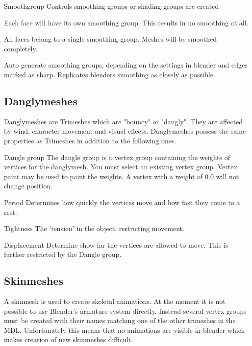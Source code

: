 \begin{propertyAurora}{Smoothgroup}
Controls smoothing groups or shading groups are created
\begin{description}[leftmargin=6em,style=nextline]
    \item[Separate] Each face will have its own smoothing group. This results in no smoothing at all.
    \item[Single] All faces belong to a single smoothing group. Meshes will be smoothed completely.
    \item[Auto] Auto generate smoothing groups, depending on the settings in blender and edges marked as sharp. Replicates blenders smoothing as closely as possible.
\end{description}
\end{propertyAurora}

\subsection{Danglymeshes}

Danglymeshes are Trimeshes which are "bouncy" or "dangly". They are affected by
wind, character movement and visual effects. Danglymeshes possess the same 
properties as Trimeshes in addition to the following ones.

\begin{propertyAurora}{Dangle group} 
The dangle group is a vertex group containing the weights of vertices for the danglymesh. 
You must select an existing vertex group. Vertex paint may be used to paint the weights. A vertex with a weight of
0.0 will not change position.
\end{propertyAurora}

\begin{propertyAurora}{Period} 
Determines how quickly the vertices move and how fast they come to a rest.
\end{propertyAurora}
\begin{propertyAurora}{Tightness} 
The 'tension' in the object, restricting movement. 
\end{propertyAurora}
\begin{propertyAurora}{Displacement} 
Determine show far the vertices are allowed to move. This is further restricted by the Dangle group.
\end{propertyAurora}


\subsection{Skinmeshes}
A skinmesh is used to create skeletal animations. At the moment it is not 
possible to use Blender's armature system directly. Instead several vertex groups 
must be created with their names matching one of the other trimeshes in the MDL. 
Unfortunately this means that no animations are visible in blender which makes
creation of new skinmeshes difficult.



